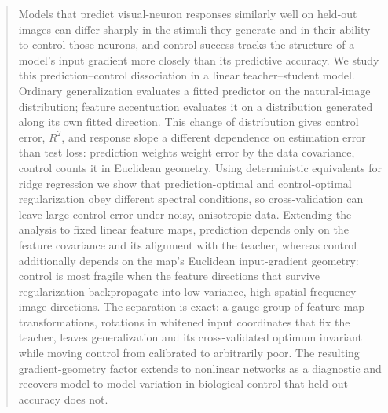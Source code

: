 %

\begin{abstract}
Models that predict visual-neuron responses similarly well on held-out images can differ sharply in the stimuli they generate and in their ability to control those neurons, and control success tracks the structure of a model's input gradient more closely than its predictive accuracy. We study this prediction--control dissociation in a linear teacher--student model. Ordinary generalization evaluates a fitted predictor on the natural-image distribution; feature accentuation evaluates it on a distribution generated along its own fitted direction. This change of distribution gives control error, $R^2$, and response slope a different dependence on estimation error than test loss: prediction weights weight error by the data covariance, control counts it in Euclidean geometry. Using deterministic equivalents for ridge regression we show that prediction-optimal and control-optimal regularization obey different spectral conditions, so cross-validation can leave large control error under noisy, anisotropic data. Extending the analysis to fixed linear feature maps, prediction depends only on the feature covariance and its alignment with the teacher, whereas control additionally depends on the map's Euclidean input-gradient geometry: control is most fragile when the feature directions that survive regularization backpropagate into low-variance, high-spatial-frequency image directions. The separation is exact: a gauge group of feature-map transformations, rotations in whitened input coordinates that fix the teacher, leaves generalization and its cross-validated optimum invariant while moving control from calibrated to arbitrarily poor. The resulting gradient-geometry factor extends to nonlinear networks as a diagnostic and recovers model-to-model variation in biological control that held-out accuracy does not.
\end{abstract}

